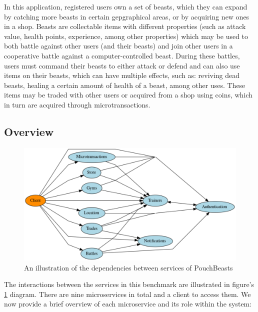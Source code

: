 In this application, registered users own a set of beasts, which they can expand by catching more beasts in certain gepgraphical areas, or by acquiring new ones in a shop. Beasts are collectable items with different properties (such as attack value, health points, experience, among other properties) which may be used to both battle against other users (and their beasts) and join other users in a cooperative battle against a computer-controlled beast. During these battles, users must command their beasts to either attack or defend and can also use items on their beasts, which can have multiple effects, such as: reviving dead beasts, healing a certain amount of health of a beast, among other uses. These items may be traded with other users or acquired from a shop using coins, which in turn are acquired through microtransactions.

\subsection{Overview}

\begin{figure}[htbp]
    \centering
    \includegraphics[width=\textwidth]{Chapters/benchmark/figures/interaction-diagram.pdf}
    \caption{An illustration of the dependencies between services of PouchBeasts}
    \label{fig:pouchbeasts-overview}
\end{figure}

The interactions between the services in this benchmark are illustrated in figure's \ref{fig:pouchbeasts-overview} diagram. There are nine microservices in total and a client to access them. We now provide a brief overview of each microservice and its role within the system:

